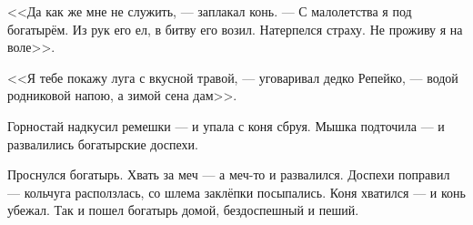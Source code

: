 <<Да как же мне не служить, --- заплакал конь.
--- С малолетства я под богатырём.
Из рук его ел, в битву его возил.
Натерпелся страху.
Не проживу я на воле>>.

<<Я тебе покажу луга с вкусной травой, --- уговаривал дедко Репейко, --- водой родниковой напою, а зимой сена дам>>.

\textspace

Горностай надкусил ремешки --- и упала с коня сбруя.
Мышка подточила --- и развалились богатырские доспехи.

Проснулся богатырь.
Хвать за меч --- а меч-то и развалился.
Доспехи поправил --- кольчуга расползлась, со шлема заклёпки посыпались.
Коня хватился --- и конь убежал.
Так и пошел богатырь домой, бездоспешный и пеший.

\newpage\thispagestyle{plain}
